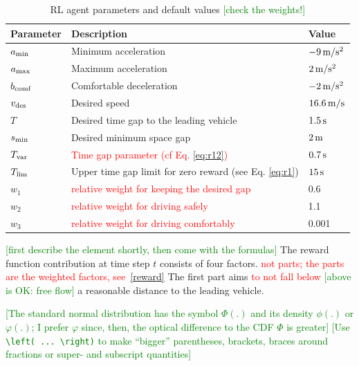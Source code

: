 \documentclass[review]{elsarticle}
\providecommand{\red}[1]{\textcolor{red}{#1}}
\providecommand{\green}[1]{\textcolor{green}{#1}}
\providecommand{\martin}[1]{\red{#1}} %
\providecommand{\martinc}[1]{\green{[#1]}} %
\providecommand{\3}{{\ss}}
\begin{document}
\begin{table}
\caption{RL agent parameters and default values \martinc{check the weights!}} 
\label{tab:agentParameters} 
\begin{center}
\begin{tabular}{ p{}| p{}| p{}}
	Parameter & Description & Value \\ \hline
	$a_{\rm min}$ & Minimum acceleration & $\unit[-9]{m/s^2}$ \\  
	$a_{\rm max}$ & Maximum acceleration & $\unit[2]{m/s^2}$ \\  
	$b_{\rm comf}$ & Comfortable deceleration & $\unit[-2]{m/s^2}$ \\  
	$v_{\rm des}$ & Desired speed & $\unit[16.6]{ m/s}$ \\  		
	$T$ & Desired time gap to the leading vehicle & $\unit[1.5]{s}$ \\
	$s_{\rm min}$ & Desired minimum space gap & $\unit[2]{m}$ \\
	$T_{\rm var}$ & \martin{Time gap parameter (cf Eq. \eqref{eq:r12})} & $\unit[0.7]{s}$ \\
	$T_{\rm lim}$ & Upper time gap limit for zero reward (see
        Eq. \eqref{eq:r1}) & $\unit[15]{s}$ \\
  $w_1$ & \martin{relative weight for keeping the desired gap} & 0.6\\
  $w_2$ & \martin{relative weight for driving safely} & 1.1\\
  $w_3$ & \martin{relative weight for driving comfortably} & 0.001\\
\end{tabular}
\end{center}
\end{table}


\martinc{first describe the element shortly, then come with
    the formulas}
The reward function contribution at time step $t$ consists of four factors. \martin{not parts; the
    parts are the weighted factors, see~\eqref{reward}}
The first part aims \martin{to not fall below} \martinc{above is OK: free flow} a reasonable
distance to the leading vehicle. 

\martinc{The standard normal distribution has the symbol $\Phi(.)$ and
    its density $\phi(.)$ or $\varphi(.)$; I prefer $\varphi$ since, then,
    the optical difference to the CDF $\Phi$ is greater}
\martinc{Use \texttt{\textbackslash left( ... \textbackslash right)}
    to make ``bigger'' parentheses, brackets, braces around fractions
    or super- and subscript quantities}
\end{document}
